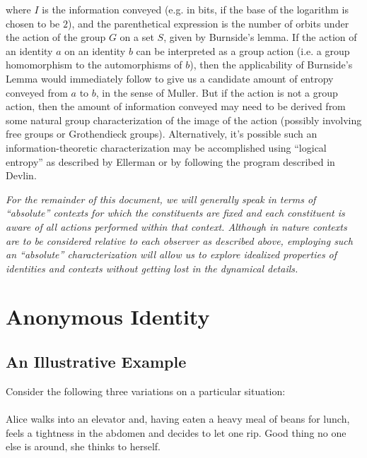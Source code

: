 \documentclass[pra,twocolumn,groupedaddress,10pt]{revtex4}
\theoremstyle{definition}
\begin{document}
where $I$ is the information conveyed (e.g. in bits, if the base of the logarithm is chosen to be $2$), and the parenthetical expression is the number of orbits under the action of the group $G$ on a set $S$, given by Burnside's lemma. If the action of an identity $a$ on an identity $b$ can be interpreted as a group action (i.e. a group homomorphism to the automorphisms of $b$), then the applicability of Burnside's Lemma would immediately follow to give us a candidate amount of entropy conveyed from $a$ to $b$, in the sense of Muller. But if the action is not a group action, then the amount of information conveyed may need to be derived from some natural group characterization of the image of the action (possibly involving free groups or Grothendieck groups\cite{grogroup}). Alternatively, it's possible such an information-theoretic characterization may be accomplished using ``logical entropy'' as described by Ellerman\cite{ellerman} or by following the program described in Devlin\cite{devlin}.

\textit{For the remainder of this document, we will generally speak in terms of ``absolute'' contexts for which the constituents are fixed and each constituent is aware of all actions performed within that context. Although in nature contexts are to be considered relative to each observer as described above, employing such an ``absolute'' characterization will allow us to explore idealized properties of identities and contexts without getting lost in the dynamical details.}

\section{Anonymous Identity} \label{sec:anoide}

\subsection{An Illustrative Example} \label{sec:illexa}

Consider the following three variations on a particular situation:

\paragraph{}

Alice walks into an elevator and, having eaten a heavy meal of beans for lunch, feels a tightness in the abdomen and decides to let one rip. Good thing no one else is around, she thinks to herself.
\end{document}
